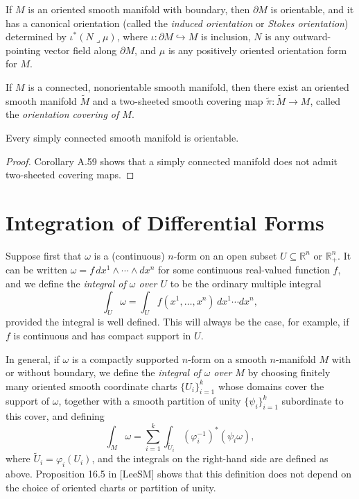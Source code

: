 \begin{proposition}
\label{prop:induced-orientation-boundary}
If $M$ is an oriented smooth manifold with boundary, then $\partial M$ is orientable, and it has a canonical orientation (called the \emph{induced orientation} or \emph{Stokes orientation}) determined by $\iota^*(N \lrcorner \mu)$, where $\iota: \partial M \hookrightarrow M$ is inclusion, $N$ is any outward-pointing vector field along $\partial M$, and $\mu$ is any positively oriented orientation form for $M$.
\end{proposition}

\begin{proposition}
\label{prop:orientation-covering-theorem}
If $M$ is a connected, nonorientable smooth manifold, then there exist an oriented smooth manifold $\tilde{M}$ and a two-sheeted smooth covering map $\tilde{\pi}: \tilde{M} \to M$, called the \emph{orientation covering of $M$}.
\end{proposition}

\begin{corollary}
\label{cor:simply-connected-orientable}
Every simply connected smooth manifold is orientable.
\end{corollary}

\begin{proof}
Corollary A.59 shows that a simply connected manifold does not admit two-sheeted covering maps.
\end{proof}

\section{Integration of Differential Forms}

Suppose first that $\omega$ is a (continuous) $n$-form on an open subset $U \subseteq \mathbb{R}^n$ or $\mathbb{R}^n_+$. It can be written $\omega = f \, dx^1 \wedge \cdots \wedge dx^n$ for some continuous real-valued function $f$, and we define the \emph{integral of $\omega$ over $U$} to be the ordinary multiple integral
\[
\int_U \omega = \int_U f(x^1,\ldots,x^n) \, dx^1 \cdots dx^n,
\]
provided the integral is well defined. This will always be the case, for example, if $f$ is continuous and has compact support in $U$.

In general, if $\omega$ is a compactly supported $n$-form on a smooth $n$-manifold $M$ with or without boundary, we define the \emph{integral of $\omega$ over $M$} by choosing finitely many oriented smooth coordinate charts $\{U_i\}_{i=1}^k$ whose domains cover the support of $\omega$, together with a smooth partition of unity $\{\psi_i\}_{i=1}^k$ subordinate to this cover, and defining
\[
\int_M \omega = \sum_{i=1}^k \int_{\tilde{U}_i} (\varphi_i^{-1})^*(\psi_i\omega),
\]
where $\tilde{U}_i = \varphi_i(U_i)$, and the integrals on the right-hand side are defined as above. Proposition 16.5 in [LeeSM] shows that this definition does not depend on the choice of oriented charts or partition of unity.

